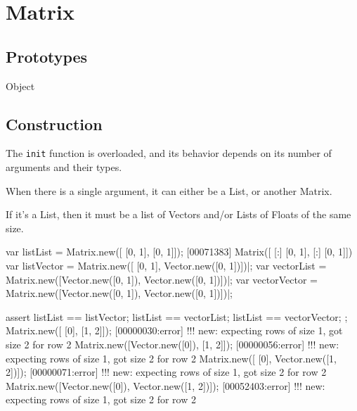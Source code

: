 
\section{Matrix}

\subsection{Prototypes}
\begin{refObjects}
\item[Object]
\end{refObjects}

\subsection{Construction}

The \lstinline|init| function is overloaded, and its behavior depends on its
number of arguments and their types.

When there is a single argument, it can either be a List, or another Matrix.

If it's a List, then it must be a list of Vectors and/or Lists of Floats of
the same size.

\begin{urbiscript}
var listList     = Matrix.new([           [0, 1],             [0, 1]]);
[00071383] Matrix([
[:]  [0, 1],
[:]  [0, 1]])
var listVector   = Matrix.new([           [0, 1],  Vector.new([0, 1])])|;
var vectorList   = Matrix.new([Vector.new([0, 1]), Vector.new([0, 1])])|;
var vectorVector = Matrix.new([Vector.new([0, 1]), Vector.new([0, 1])])|;

assert
{
  listList == listVector;
  listList == vectorList;
  listList == vectorVector;
};
Matrix.new([           [0],            [1, 2]]);
[00000030:error] !!! new: expecting rows of size 1, got size 2 for row 2
Matrix.new([Vector.new([0]),           [1, 2]]);
[00000056:error] !!! new: expecting rows of size 1, got size 2 for row 2
Matrix.new([           [0], Vector.new([1, 2])]);
[00000071:error] !!! new: expecting rows of size 1, got size 2 for row 2
Matrix.new([Vector.new([0]), Vector.new([1, 2])]);
[00052403:error] !!! new: expecting rows of size 1, got size 2 for row 2
\end{urbiscript}

